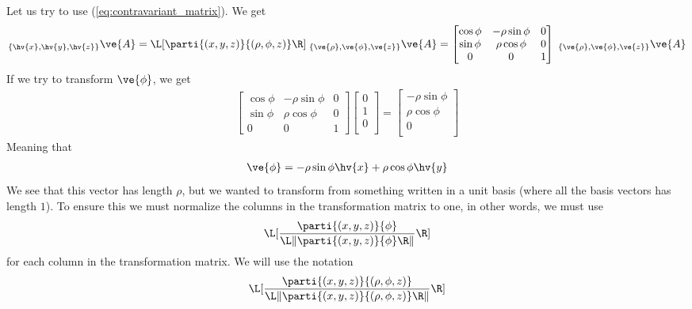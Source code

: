 \documentclass[a4paper, 12pt]{article}
\begin{document}
Let us try to use (\ref{eq:contravariant_matrix}). We get
%
\begin{align*}
 _{\{\hv{x}, \hv{y}, \hv{z}\}} \ve{A}
  =
  \L[\parti{(x, y, z)}{(\rho, \phi, z)}\R] \;
   _{\{\ve{\rho}, \ve{\phi},\ve{z}\}}\ve{A}
  = \begin{bmatrix} \cos\phi & -\rho\sin\phi & 0 \\
                    \sin\phi &  \rho\cos\phi & 0 \\
                    0 & 0 & 1
 \end{bmatrix} \;
 _{\{\ve{\rho}, \ve{\phi},\ve{z}\}}\ve{A}
\end{align*}
%
If we try to transform $\ve{\phi}$, we get
%
\begin{align*} 
  \begin{bmatrix} \cos\phi & -\rho\sin\phi & 0 \\
                    \sin\phi &  \rho\cos\phi & 0 \\
                    0 & 0 & 1
 \end{bmatrix}
 \begin{bmatrix} 0 \\
		 1 \\
		 0 \\
 \end{bmatrix}
 =
 \begin{bmatrix} -\rho\sin\phi \\
		 \rho\cos\phi \\
		 0 \\
 \end{bmatrix}
\end{align*}
%
Meaning that 
%
\begin{align*}
 \ve{\phi} = -\rho\sin\phi \hv{x} + \rho\cos\phi \hv{y}
\end{align*}
%
We see that this vector has length $\rho$, but we wanted to transform from 
something written in a unit basis (where all the basis vectors has length $1$). 
To ensure this we must normalize the columns in the transformation matrix to 
one, in other words, we must use
%
\begin{align*}
  \L[
     \frac{\displaystyle \parti{(x, y, z)}{\phi}}{
           \displaystyle \L\|\parti{(x,y, z)}{\phi}\R\| } \R]
\end{align*}
%
for each column in the transformation matrix. We will use the notation
%
\begin{align*}
  \L[
     \frac{\displaystyle \parti{(x, y, z)}{(\rho, \phi, z)}}{
           \displaystyle \L\|\parti{(x,y, z)}{(\rho, \phi, z)}\R\| } \R]
\end{align*}
\end{document}
